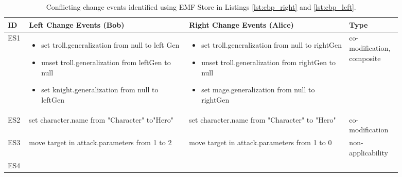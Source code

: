 \begin{table}[ht]
  \centering
  \caption{Conflicting change events identified using EMF Store in Listings \ref{lst:cbp_right} and \ref{lst:cbp_left}.}
  \label{table:conflicts_emfs}
    \begin{tabular}{|p{0.04\linewidth}|p{0.37\linewidth}|p{0.37\linewidth}|
        p{0.11\linewidth}|}
      \hline
      \textbf{ID} & 
      \textbf{Left Change Events (Bob)} & 
      \textbf{Right Change Events (Alice)} & 
      \textbf{Type}\\ 
      \hline
      ES1 & 
      \begin{minipage}[t]{\linewidth}
        \raggedright
        \begin{itemize}[leftmargin=0pt]
          \setlength
          \item[] set troll.generalization from null to left
          Gen
          \item[] unset troll.generalization from leftGen
          to null
          \item[] set knight.generalization from null
          to leftGen
        \end{itemize}
      \end{minipage} & 
      \begin{minipage}[t]{\linewidth}
        \raggedright
        \begin{itemize}[leftmargin=0pt]
          \setlength
          \item[] set troll.generalization from null to
          rightGen
          \item[] unset troll.generalization from rightGen
          to null
          \item[] set mage.generalization from null to
          rightGen
        \end{itemize}
      \end{minipage} & 
      co-modification,
      composite \\
      \hline
      ES2 & set character.name from "Character"
      to"Hero" & 
      set character.name from "Character"
      to "Hero" & 
      co-modification \\ 
      \hline
      ES3 & 
      move target in attack.parameters from
      1 to 2
      & 
      move target in attack.parameters from
      1 to 0
      & 
      non-applicability\\
      \hline
      ES4 & 
      \begin{minipage}[t]{\linewidth}
        \raggedright
        \begin{itemize}[leftmargin=0pt]

\end{itemize}
\end{minipage}
\end{tabular}
\end{table}
